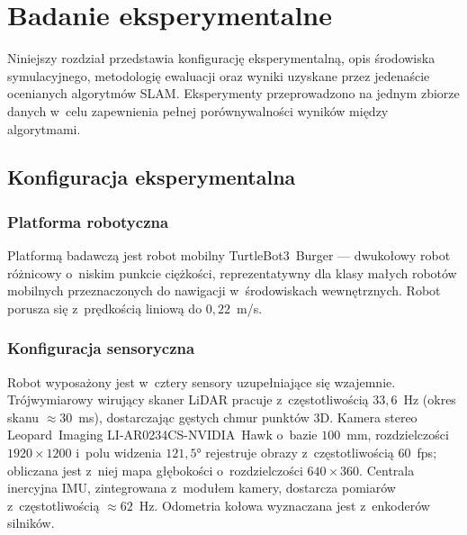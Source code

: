


\chapter{Badanie eksperymentalne}

Niniejszy rozdział przedstawia konfigurację eksperymentalną, opis środowiska
symulacyjnego, metodologię ewaluacji oraz wyniki uzyskane przez jedenaście
ocenianych algorytmów SLAM.
Eksperymenty przeprowadzono na jednym zbiorze danych w~celu zapewnienia
pełnej porównywalności wyników między algorytmami.

\section{Konfiguracja eksperymentalna}

\subsection{Platforma robotyczna}

Platformą badawczą jest robot mobilny TurtleBot3~Burger --- dwukołowy robot
różnicowy o~niskim punkcie ciężkości, reprezentatywny dla klasy małych robotów
mobilnych przeznaczonych do nawigacji w~środowiskach wewnętrznych.
Robot porusza się z~prędkością liniową do $0{,}22$~m/s.

\subsection{Konfiguracja sensoryczna}

Robot wyposażony jest w~cztery sensory uzupełniające się wzajemnie.
Trójwymiarowy wirujący skaner LiDAR pracuje z~częstotliwością $33{,}6$~Hz
(okres skanu $\approx30$~ms), dostarczając gęstych chmur punktów 3D.
Kamera stereo Leopard~Imaging LI-AR0234CS-NVIDIA~Hawk o~bazie $100$~mm,
rozdzielczości $1920\times1200$ i~polu widzenia $121{,}5°$ rejestruje obrazy
z~częstotliwością $60$~fps; obliczana jest z~niej mapa głębokości o~rozdzielczości
$640\times360$.
Centrala inercyjna IMU, zintegrowana z~modułem kamery, dostarcza pomiarów
z~częstotliwością $\approx62$~Hz.
Odometria kołowa wyznaczana jest z~enkoderów silników.

